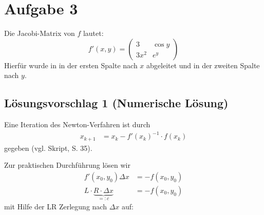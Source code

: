 \section*{Aufgabe 3}
Die Jacobi-Matrix von $f$ lautet:
\[f' (x,y) = \begin{pmatrix}
	3     & \cos y\\
	3 x^2 & e^y
\end{pmatrix}\]
Hierfür wurde in in der ersten Spalte nach $x$ abgeleitet und in der
zweiten Spalte nach $y$.

\subsection*{Lösungsvorschlag 1 (Numerische Lösung)}
Eine Iteration des Newton-Verfahren ist durch
\begin{align}
x_{k+1}&=x_{k}-f'(x_k)^{-1}\cdot f(x_k)
\end{align}
gegeben (vgl. Skript, S. 35).

Zur praktischen Durchführung lösen wir
\begin{align}
    f'(x_0, y_0)\Delta x &= -f(x_0,y_0)\\
    L \cdot \underbrace{R \cdot \Delta x}_{=: c} &= -f(x_0, y_0)
\end{align}
mit Hilfe der LR Zerlegung nach $\Delta x$ auf:

